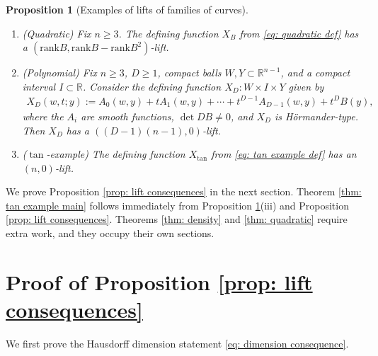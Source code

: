 \documentclass[reqno,11pt]{amsart}
\numberwithin{equation}{section}
\numberwithin{figure}{section}
\def\R{\mathbb{R}}
\renewcommand\geq{\geqslant}
\theoremstyle{plain}
\newtheorem{proposition}[thm]{Proposition}
\theoremstyle{definition}
\newcommand{\rank}{\mathrm{rank}}
\begin{document}
    \begin{proposition}[Examples of lifts of families of curves] \label{prop: lifting examples}\hspace{0pt} 
        \begin{enumerate}[label=(\roman*)]
            \item (Quadratic) Fix $n \geq 3$. The defining function $X_B$ from \eqref{eq: quadratic def} has a $(\rank B, \rank B - \rank B^2)$-lift.
            \item (Polynomial) Fix $n\geq 3$, $D \geq 1$, compact balls $W,Y \subset \R^{n-1}$, and a compact interval $I \subset \R$. Consider the defining function $X_D : W \times I \times Y$ given by 
            \begin{align}
                X_D(w,t;y) := A_0(w,y) + tA_1(w,y) + \cdots + t^{D-1} A_{D-1}(w,y) + t^D B(y),
            \end{align}
            where the $A_i$ are smooth functions, $\det DB \neq 0$, and $X_D$ is H\"ormander-type. Then $X_D$ has a $((D-1)(n-1), 0)$-lift.
            \item ($\tan$-example) The defining function $X_{\tan}$ from \eqref{eq: tan example def} has an $(n,0)$-lift. 
        \end{enumerate}
    \end{proposition}

    We prove Proposition \ref{prop: lift consequences} in the next section. Theorem \ref{thm: tan example main} follows immediately from Proposition \ref{prop: lifting examples}(iii) and Proposition \ref{prop: lift consequences}. Theorems \ref{thm: density} and \ref{thm: quadratic} require extra work, and they occupy their own sections. 

    
   

    




    


    \section{Proof of Proposition \ref{prop: lift consequences}} \label{sec: prop: lift consequences}

    We first prove the Hausdorff dimension statement \eqref{eq: dimension consequence}.
\end{document}
